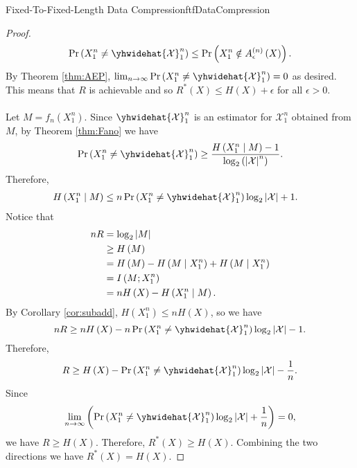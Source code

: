 \documentclass[math]{amznotes}
\theoremstyle{remark}
\begin{document}
\begin{thmbox}{Fixed-To-Fixed-Length Data Compression}{ftfDataCompression}
\begin{proof}
\begin{equation*}
            \Pr\left(X_1^n \neq \yhwidehat{\mathcal{X}}_1^n\right) \leq \Pr\left(X_1^n \notin A_{\epsilon}^{\left(n\right)}\left(X\right)\right).
        \end{equation*}
        By Theorem \ref{thm:AEP}, $\lim_{n \to \infty}\Pr\left(X_1^n \neq \yhwidehat{\mathcal{X}}_1^n\right) = 0$ as desired. This means that $R$ is achievable and so $R^*\left(X\right) \leq H\left(X\right) + \epsilon$ for all $\epsilon > 0$.
        \\\\
        Let $M = f_n\left(X_1^n\right)$. Since $\yhwidehat{\mathcal{X}}_1^n$ is an estimator for $\mathcal{X}_1^n$ obtained from $M$, by Theorem \ref{thm:Fano} we have 
        \begin{equation*}
            \Pr\left(X_1^n \neq \yhwidehat{\mathcal{X}}_1^n\right) \geq \frac{H\left(X_1^n \mid M\right) - 1}{\log_2\left(\abs{\mathcal{X}}^n\right)}.
        \end{equation*}
        Therefore,
        \begin{align*}
            H\left(X_1^n \mid M\right) & \leq n\Pr\left(X_1^n \neq \yhwidehat{\mathcal{X}}_1^n\right)\log_2\abs{\mathcal{X}} + 1.
        \end{align*}
        Notice that 
        \begin{align*}
            nR & = \log_2{\left\lvert {M} \right\rvert} \\
            & \geq H\left(M\right) \\
            & = H\left(M\right) - H\left(M \mid X_1^n\right) + H\left(M \mid X_1^n\right) \\
            & = I\left(M ; X_1^n\right) \\
            & = nH\left(X\right) - H\left(X_1^n \mid M\right).
        \end{align*}
        By Corollary \ref{cor:subadd}, $H\left(X_1^n\right) \leq nH\left(X\right)$, so we have 
        \begin{equation*}
            nR \geq nH\left(X\right) - n\Pr\left(X_1^n \neq \yhwidehat{\mathcal{X}}_1^n\right)\log_2\abs{\mathcal{X}} - 1.
        \end{equation*}
        Therefore, 
        \begin{equation*}
            R \geq H\left(X\right) - \Pr\left(X_1^n \neq \yhwidehat{\mathcal{X}}_1^n\right)\log_2\abs{\mathcal{X}} - \frac{1}{n}.
        \end{equation*}
        Since 
        \begin{equation*}
            \lim_{n \to \infty}\left(\Pr\left(X_1^n \neq \yhwidehat{\mathcal{X}}_1^n\right)\log_2\abs{\mathcal{X}} + \frac{1}{n}\right) = 0,
        \end{equation*}
        we have $R \geq H\left(X\right)$. Therefore, $R^*\left(X\right) \geq H\left(X\right)$. Combining the two directions we have $R^*\left(X\right) = H\left(X\right)$.
    \end{proof}
\end{thmbox}
\end{document}

